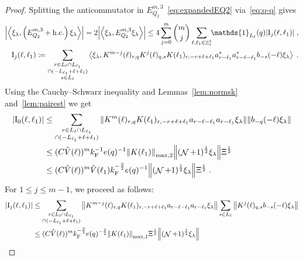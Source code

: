 \documentclass[12pt,a4paper]{article}
\numberwithin{equation}{section}
\newcommand{\1}{\mathbb{I}}
\newcommand{\F}{\mathrm{F}}
\newcommand{\I}{\mathrm{I}}
\DeclareMathOperator{\Z}{\mathbb{Z}}
\DeclareMathOperator{\NN}{\mathcal{N}}
\newcommand{\half}{\frac{1}{2}}
\newcommand{\eva}[1]{\left\langle #1 \right\rangle}
\theoremstyle{plain}
\theoremstyle{definition}
\theoremstyle{remark}
\theoremstyle{plain}
\theoremstyle{definition}
\theoremstyle{remark}
\begin{document}
\begin{proof}
Splitting the anticommutator in $ E^{m,3}_{Q_2} $~\eqref{eq:expandedEQ2} via~\eqref{eq:q-q} gives
\begin{equation} \label{eq:EQ2151}
\begin{aligned}
	\abs{\eva{\xi_\lambda,\left(E^{m,3}_{Q_2}+\mathrm{h.c.}\right) \xi_\lambda }} 
	= 2\abs{\eva{\xi_\lambda, E^{m,3}_{Q_2} \xi_\lambda }}
	\le 4 \sum_{j=0}^m {{m}\choose j} \sum_{\ell,\ell_1 \in \Z^3_*}\!\! \mathds{1}_{L_\ell}(q) |\I_j(\ell, \ell_1)| \;,\\
	\I_j(\ell, \ell_1)
	\coloneq \sum_{\substack{r\in L_{\ell} \cap L_{\ell_1}\\ \cap (-L_{\ell_1}+\ell+\ell_1)\\ s \in L_{\ell}}}
		\eva{\xi_\lambda, K^{m-j}(\ell)_{r,q} K^{j}(\ell)_{q,s} K(\ell_1)_{r,-r+\ell+\ell_1} a^*_{r-\ell_1} a^*_{r-\ell-\ell_1} b_{-s}(-\ell) \xi_\lambda} \;. \\
\end{aligned}
\end{equation}
Using the Cauchy--Schwarz inequality and Lemmas~\ref{lem:normsk} and~\ref{lem:pairest} we get
\begin{align}
	|\I_0(\ell, \ell_1)|
	&\leq \sum_{\substack{r\in L_{\ell} \cap L_{\ell_1} \\ \cap (-L_{\ell_1}+\ell+\ell_1)}} \norm{K^m(\ell)_{r,q} K(\ell_1)_{r,-r+\ell+\ell_1} a_{r-\ell-\ell_1} a_{r-\ell_1} \xi_\lambda}\norm{ b_{-q}(-\ell) \xi_\lambda}\nonumber\\
	&\leq (C \hat{V}(\ell))^m k_{\F}^{-1} e(q)^{-1}
		\norm{K(\ell_1)}_{\max,2} \norm{ (\NN+1)^\half \xi_\lambda } \Xi^{\half} \nonumber\\
	&\leq (C \hat{V}(\ell))^m
		\hat{V}(\ell_1)
		k_{\F}^{-\frac 32} e(q)^{-1}
		\norm{ (\NN+1)^\half \xi_\lambda } \Xi^{\half} \;. \label{eq:estEQ2151}
\end{align}
For $ 1 \le j \le m-1 $, we proceed as follows:
\begin{align}
	|\I_j(\ell, \ell_1)|
	&\leq \sum_{\substack{r\in L_{\ell} \cap L_{\ell_1}\\ \cap (-L_{\ell_1}+\ell+\ell_1)}}
		\norm{ K^{m-j}(\ell)_{r,q} K(\ell_1)_{r,-r+\ell+\ell_1} a_{r-\ell-\ell_1} a_{r-\ell_1} \xi_\lambda}
		\sum_{s \in L_{\ell}}
		\norm{ K^j(\ell)_{q,s} b_{-s}(-\ell) \xi_\lambda }\nonumber\\
	&\leq (C \hat{V}(\ell))^m k_{\F}^{-\frac 32} e(q)^{-\frac 32}
		\norm{K(\ell_1)}_{\max,1} \Xi^{\half}
		\norm{ (\NN+1)^\half \xi_\lambda} \nonumber\\

\end{align}
\end{proof}
\end{document}

